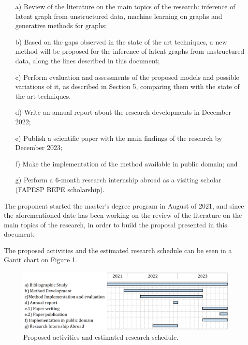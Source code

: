 \documentclass[12pt,a4paper]{article}
\begin{document}
	\begin{itemize}
	\item[a)]  Review of the literature on the main topics of the research: inference of latent graph from unstructured data, machine learning on graphs and generative methods for graphs;
	\item[b)] Based on the gaps observed in the state of the art techniques, a new method will be proposed for the inference of latent graphs from unstructured data, along the lines described in this document;
	\item[c)] Perform evaluation and assessments of the proposed models and possible variations of it, as described in Section 5, comparing them with the state of the art techniques.
	\item[d)] Write an annual report about the research developments in December 2022;
	\item[e)] Publish a scientific paper with the main findings of the research by December 2023;
	\item[f)] Make the implementation of the method available in public domain; and
	\item[g)] Perform a 6-month research internship abroad as a visiting scholar (FAPESP BEPE scholarship).
	\end{itemize}

	The proponent started the master's degree program in August of 2021, and since the aforementioned date has been working on the review of the literature on the main topics of the research, in order to build the proposal presented in this document.

	The proposed activities and the estimated research schedule can be seen in a Gantt chart on Figure \ref{plan}.

	\begin{figure}[hbtp]
		\centering \includegraphics[scale=0.40]{plan_v3.png}
		\caption{Proposed activities and estimated research schedule. \label{plan}}
	\end{figure}

	\printbibliography
\end{document}
